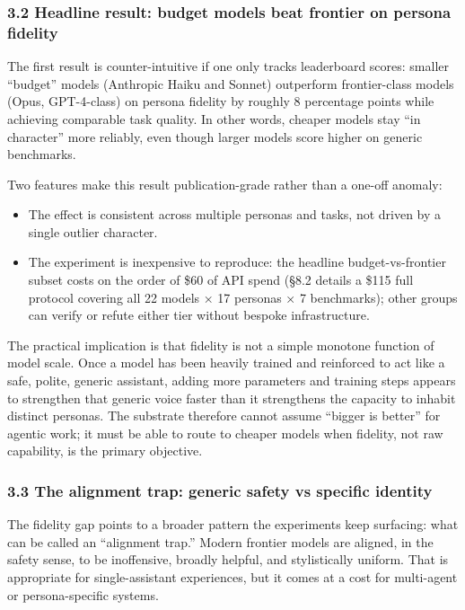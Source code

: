 \subsubsection{3.2 Headline result: budget models beat frontier on
persona
fidelity}\label{headline-result-budget-models-beat-frontier-on-persona-fidelity}

The first result is counter-intuitive if one only tracks leaderboard
scores: smaller ``budget'' models (Anthropic Haiku and Sonnet)
outperform frontier-class models (Opus, GPT-4-class) on persona fidelity
by roughly 8 percentage points while achieving comparable task quality.
In other words, cheaper models stay ``in character'' more reliably, even
though larger models score higher on generic benchmarks.

Two features make this result publication-grade rather than a one-off
anomaly:

\begin{itemize}
\tightlist
\item
  The effect is consistent across multiple personas and tasks, not
  driven by a single outlier character.
\item
  The experiment is inexpensive to reproduce: the headline
  budget-vs-frontier subset costs on the order of \$60 of API spend
  (§8.2 details a \$115 full protocol covering all 22 models × 17
  personas × 7 benchmarks); other groups can verify or refute either
  tier without bespoke infrastructure.
\end{itemize}

The practical implication is that fidelity is not a simple monotone
function of model scale. Once a model has been heavily trained and
reinforced to act like a safe, polite, generic assistant, adding more
parameters and training steps appears to strengthen that generic voice
faster than it strengthens the capacity to inhabit distinct personas.
The substrate therefore cannot assume ``bigger is better'' for agentic
work; it must be able to route to cheaper models when fidelity, not raw
capability, is the primary objective.

\subsubsection{3.3 The alignment trap: generic safety vs specific
identity}\label{the-alignment-trap-generic-safety-vs-specific-identity}

The fidelity gap points to a broader pattern the experiments keep
surfacing: what can be called an ``alignment trap.'' Modern frontier
models are aligned, in the safety sense, to be inoffensive, broadly
helpful, and stylistically uniform. That is appropriate for
single-assistant experiences, but it comes at a cost for multi-agent or
persona-specific systems.

